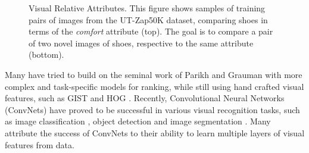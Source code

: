 \begin{figure}
{}
\caption{Visual Relative Attributes. This figure shows samples of training pairs of images from the UT-Zap50K dataset, comparing shoes in terms of the \textit{comfort} attribute (top). The goal is to compare a pair of two novel images of shoes, respective to the same attribute (bottom).}
\label{fig.1}
\end{figure}

Many have tried to build on the seminal work of Parikh and Grauman \cite{parikh2011} with more complex and task-specific models for ranking, while still using hand crafted visual features, such as GIST \cite{Aude01} and HOG \cite{hog}. Recently, Convolutional Neural Networks (ConvNets) have proved to be successful in various visual recognition tasks, such as image classification \cite{krizshevsky}, object detection \cite{RCNN} and image segmentation \cite{fullyconv}. Many attribute the success of ConvNets to their ability to learn multiple layers of visual features from data. 

